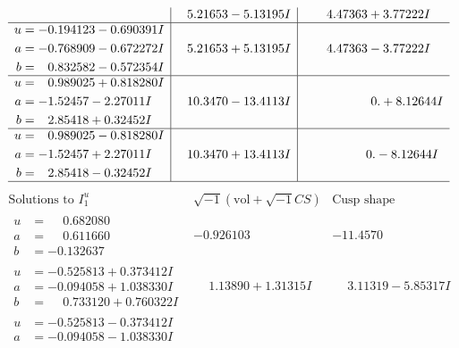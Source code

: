 \documentclass[1p]{elsarticle_modified}
\theoremstyle{definition}
\newcommand{\I}{\sqrt{-1}}
\begin{document}
$$\begin{array}{c|c|c}
 & \phantom{-}5.21653 - 5.13195 I & \phantom{-}4.47363 + 3.77222 I \\ \hline\begin{aligned}
u &= -0.194123 - 0.690391 I \\
a &= -0.768909 - 0.672272 I \\
b &= \phantom{-}0.832582 - 0.572354 I\end{aligned}
 & \phantom{-}5.21653 + 5.13195 I & \phantom{-}4.47363 - 3.77222 I \\ \hline\begin{aligned}
u &= \phantom{-}0.989025 + 0.818280 I \\
a &= -1.52457 - 2.27011 I \\
b &= \phantom{-}2.85418 + 0.32452 I\end{aligned}
 & \phantom{-}10.3470 - 13.4113 I & \phantom{-0.000000 -}0. + 8.12644 I \\ \hline\begin{aligned}
u &= \phantom{-}0.989025 - 0.818280 I \\
a &= -1.52457 + 2.27011 I \\
b &= \phantom{-}2.85418 - 0.32452 I\end{aligned}
 & \phantom{-}10.3470 + 13.4113 I & \phantom{-0.000000 } 0. - 8.12644 I\\
 \hline 
 \end{array}$$\newpage$$\begin{array}{c|c|c}  
\text{Solutions to }I^u_{1}& \I (\text{vol} + \sqrt{-1}CS) & \text{Cusp shape}\\
 \hline 
\begin{aligned}
u &= \phantom{-}0.682080\phantom{ +0.000000I} \\
a &= \phantom{-}0.611660\phantom{ +0.000000I} \\
b &= -0.132637\phantom{ +0.000000I}\end{aligned}
 & -0.926103\phantom{ +0.000000I} & -11.4570\phantom{ +0.000000I} \\ \hline\begin{aligned}
u &= -0.525813 + 0.373412 I \\
a &= -0.094058 + 1.038330 I \\
b &= \phantom{-}0.733120 + 0.760322 I\end{aligned}
 & \phantom{-}1.13890 + 1.31315 I & \phantom{-}3.11319 - 5.85317 I \\ \hline\begin{aligned}
u &= -0.525813 - 0.373412 I \\
a &= -0.094058 - 1.038330 I \\

\end{aligned}
\end{array}$$
\end{document}

